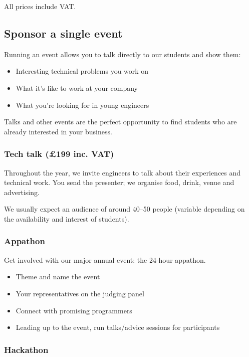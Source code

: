 \documentclass[]{article}
\begin{document}
All prices include VAT.

\pagebreak


\subsection*{Sponsor a single event}

Running an event allows you to talk directly to our students and show them:

\begin{itemize}
	\item Interesting technical problems you work on
    \item What it's like to work at your company
    \item What you're looking for in young engineers
\end{itemize}

Talks and other events are the perfect opportunity to find students who are already interested in your business.

\subsubsection*{Tech talk (\pounds 199 inc. VAT)}

Throughout the year, we invite engineers to talk about their experiences and technical work. You send the presenter; we organise food, drink, venue and advertising.

We usually expect an audience of around 40--50 people (variable depending on the availability and interest of students). 

\subsubsection*{Appathon}

Get involved with our major annual event: the 24-hour appathon.

\begin{itemize}
	\item Theme and name the event
    \item Your representatives on the judging panel
    \item Connect with promising programmers
    \item Leading up to the event, run talks/advice sessions for participants
\end{itemize}

\subsubsection*{Hackathon}
\end{document}
